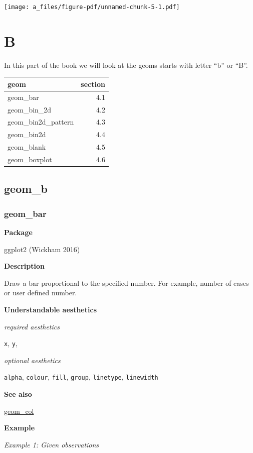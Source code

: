 \documentclass[
  letterpaper,
  DIV=11,
  numbers=noendperiod]{scrreprt}
\begin{document}
\texttt{[image: a\_files/figure-pdf/unnamed-chunk-5-1.pdf]}

\part{B}

In this part of the book we will look at the geoms starts with letter
``b'' or ``B''.

\begin{longtable}[]{@{}lr@{}}
\toprule\noalign{}
geom & section \\
\midrule\noalign{}
\endhead
\bottomrule\noalign{}
\endlastfoot
geom\_bar & 4.1 \\
geom\_bin\_2d & 4.2 \\
geom\_bin2d\_pattern & 4.3 \\
geom\_bin2d & 4.4 \\
geom\_blank & 4.5 \\
geom\_boxplot & 4.6 \\
\end{longtable}

\chapter{geom\_b}\label{sec-b}

\section{geom\_bar}\label{bar}

\textbf{Package}

ggplot2 (Wickham 2016)

\textbf{Description}

Draw a bar proportional to the specified number. For example, number of
cases or user defined number.

\textbf{Understandable aesthetics}

\emph{required aesthetics}

\texttt{x}, \texttt{y},

\emph{optional aesthetics}

\texttt{alpha}, \texttt{colour}, \texttt{fill}, \texttt{group},
\texttt{linetype}, \texttt{linewidth}

\textbf{See also}

\hyperref[col]{geom\_col}

\textbf{Example}

\emph{Example 1: Given observations}
\end{document}
